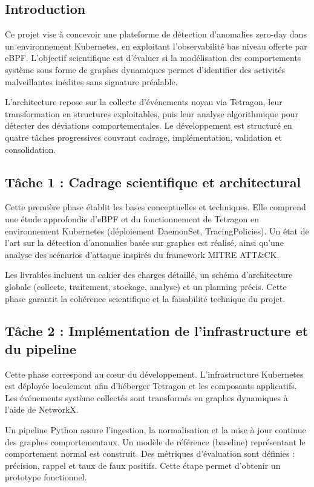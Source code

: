 \documentclass[a4paper,12pt]{article}
\begin{document}
\subsection{Introduction}

Ce projet vise à concevoir une plateforme de détection d’anomalies zero-day dans un environnement Kubernetes, en exploitant l’observabilité bas niveau offerte par eBPF. L’objectif scientifique est d’évaluer si la modélisation des comportements système sous forme de graphes dynamiques permet d’identifier des activités malveillantes inédites sans signature préalable.

L’architecture repose sur la collecte d’événements noyau via Tetragon, leur transformation en structures exploitables, puis leur analyse algorithmique pour détecter des déviations comportementales. Le développement est structuré en quatre tâches progressives couvrant cadrage, implémentation, validation et consolidation.

\subsection{Tâche 1 : Cadrage scientifique et architectural}

Cette première phase établit les bases conceptuelles et techniques. Elle comprend une étude approfondie d’eBPF et du fonctionnement de Tetragon en environnement Kubernetes (déploiement DaemonSet, TracingPolicies). Un état de l’art sur la détection d’anomalies basée sur graphes est réalisé, ainsi qu’une analyse des scénarios d’attaque inspirés du framework MITRE ATT\&CK.

Les livrables incluent un cahier des charges détaillé, un schéma d’architecture globale (collecte, traitement, stockage, analyse) et un planning précis. Cette phase garantit la cohérence scientifique et la faisabilité technique du projet.

\subsection{Tâche 2 : Implémentation de l’infrastructure et du pipeline}

Cette phase correspond au cœur du développement. L’infrastructure Kubernetes est déployée localement afin d’héberger Tetragon et les composants applicatifs. Les événements système collectés sont transformés en graphes dynamiques à l’aide de NetworkX.

Un pipeline Python assure l’ingestion, la normalisation et la mise à jour continue des graphes comportementaux. Un modèle de référence (baseline) représentant le comportement normal est construit. Des métriques d’évaluation sont définies : précision, rappel et taux de faux positifs. Cette étape permet d’obtenir un prototype fonctionnel.
\end{document}
